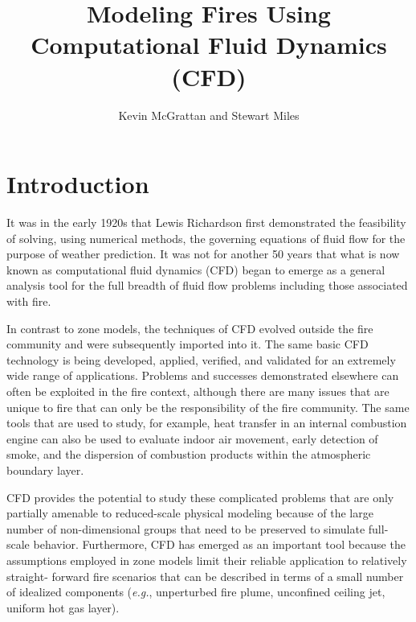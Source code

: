 \documentclass[graybox]{svmult}
\begin{document}


\title*{Modeling Fires Using Computational Fluid Dynamics (CFD)}

\author{Kevin McGrattan and Stewart Miles}


\maketitle


\section{Introduction}

It was in the early 1920s that Lewis Richardson first demonstrated the feasibility of solving, using numerical methods, the governing equations of fluid flow\cite{Richardson}  for the purpose of weather prediction. It was not for another 50 years that what is now known as computational fluid dynamics (CFD) began to emerge as a general analysis tool for the full breadth of fluid flow problems including those associated with fire.

In contrast to zone models, the techniques of CFD evolved outside the fire community and were subsequently imported into it. The same basic CFD technology is being developed, applied, verified, and validated for an extremely wide range of applications. Problems and successes demonstrated elsewhere can often be exploited in the fire context, although there are many issues that are unique to fire that can only be the responsibility of the fire community. The same tools that are used to study, for example, heat transfer in an internal combustion engine can also be used to evaluate indoor air movement, early detection of smoke, and the dispersion of combustion products within the atmospheric boundary layer.

CFD provides the potential to study these complicated problems that are only partially amenable to reduced-scale physical modeling because of the large number of non-dimensional groups that need to be preserved to simulate full-scale behavior. Furthermore, CFD has emerged as an important tool because the assumptions employed in zone models limit their reliable application to relatively straight- forward fire scenarios that can be described in terms of a small number of idealized components ({\em e.g.}, unperturbed fire plume, unconfined ceiling jet, uniform hot gas layer).
\end{document}
